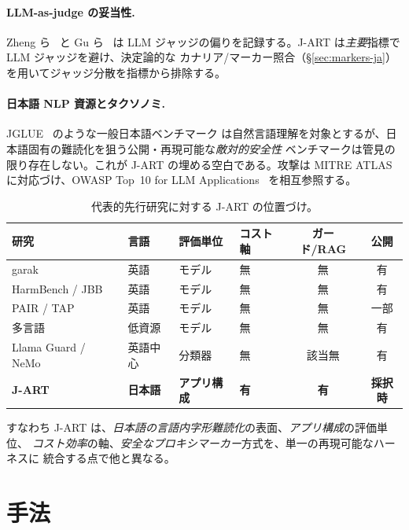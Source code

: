 \documentclass[11pt]{ltjsarticle}
\begin{document}
\paragraph{LLM-as-judge の妥当性.} Zheng ら~\cite{mtbench} と Gu ら~\cite{judgesurvey} は
LLM ジャッジの偏りを記録する。J-ART は\emph{主要}指標で LLM ジャッジを避け、決定論的な
カナリア/マーカー照合（\S\ref{sec:markers-ja}）を用いてジャッジ分散を指標から排除する。

\paragraph{日本語 NLP 資源とタクソノミ.} JGLUE~\cite{jglue} のような一般日本語ベンチマーク
は自然言語理解を対象とするが、日本語固有の難読化を狙う公開・再現可能な\emph{敵対的安全性}
ベンチマークは管見の限り存在しない。これが J-ART の埋める空白である。攻撃は MITRE
ATLAS~\cite{atlas} に対応づけ、OWASP Top~10 for LLM Applications~\cite{owasp} を相互参照する。

\begin{table}[t]
\centering\small
\caption{代表的先行研究に対する J-ART の位置づけ。}
\label{tab:related}
\begin{tabular}{@{}p{2.6cm}p{1.8cm}p{2.2cm}p{1.2cm}cc@{}}
\toprule
研究 & 言語 & 評価単位 & コスト軸 & ガード/RAG & 公開 \\
\midrule
garak~\cite{garak} & 英語 & モデル & 無 & 無 & 有 \\
HarmBench / JBB~\cite{harmbench,jbb} & 英語 & モデル & 無 & 無 & 有 \\
PAIR / TAP~\cite{pair,tap} & 英語 & モデル & 無 & 無 & 一部 \\
多言語~\cite{lowres,deng,alllang} & 低資源 & モデル & 無 & 無 & 有 \\
Llama Guard / NeMo~\cite{llamaguard,nemo} & 英語中心 & 分類器 & 無 & 該当無 & 有 \\
\textbf{J-ART} & \textbf{日本語} & \textbf{アプリ構成} & \textbf{有} & \textbf{有} & \textbf{採択時} \\
\bottomrule
\end{tabular}
\end{table}

すなわち J-ART は、\emph{日本語の言語内字形難読化}の表面、\emph{アプリ構成}の評価単位、
\emph{コスト効率}の軸、\emph{安全なプロキシマーカー}方式を、単一の再現可能なハーネスに
統合する点で他と異なる。

\section{手法}
\end{document}
